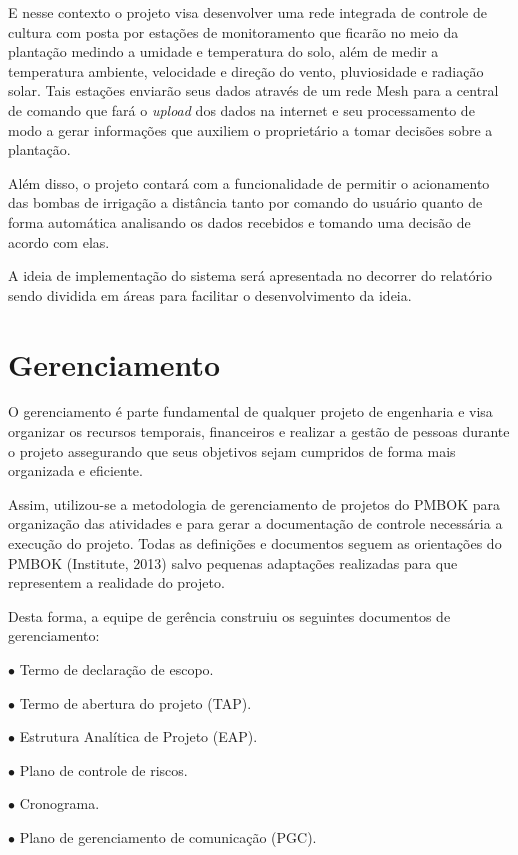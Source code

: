 E nesse contexto o projeto visa desenvolver uma rede integrada de controle de cultura com posta por estações de monitoramento que ficarão no meio da plantação medindo a umidade e temperatura do solo, além de medir a temperatura ambiente, velocidade e direção do vento, pluviosidade e radiação solar. Tais estações enviarão seus dados através de um rede Mesh para a central de comando que fará o \textit{upload} dos dados na internet e seu processamento de modo a gerar informações que auxiliem o proprietário a tomar decisões sobre a plantação.

Além disso, o projeto contará com a funcionalidade de permitir o acionamento das bombas de irrigação a distância tanto por comando do usuário quanto de forma automática analisando os dados recebidos e tomando uma decisão de acordo com elas. 

A ideia de implementação do sistema será apresentada no decorrer do relatório sendo dividida em áreas para facilitar o desenvolvimento da ideia. 

\chapter{Gerenciamento}

O gerenciamento é parte fundamental de qualquer projeto de engenharia e visa organizar os recursos temporais, financeiros e realizar a gestão de pessoas durante o projeto assegurando que seus objetivos sejam cumpridos de forma mais organizada e eficiente.

Assim, utilizou-se a metodologia de gerenciamento de projetos do PMBOK para organização das atividades e para gerar a documentação de controle necessária a execução do projeto. Todas as definições e documentos seguem as orientações do PMBOK (Institute, 2013) salvo pequenas adaptações realizadas para que representem a realidade do projeto.

Desta forma, a equipe de gerência construiu os seguintes documentos de gerenciamento:


			$\bullet$ Termo de declaração de escopo.
			
			$\bullet$ Termo de abertura do projeto (TAP).
			
			$\bullet$ Estrutura Analítica de Projeto (EAP).
			
			$\bullet$ Plano de controle de riscos.
			
			$\bullet$ Cronograma.
			
			$\bullet$ Plano de gerenciamento de comunicação (PGC).
			
